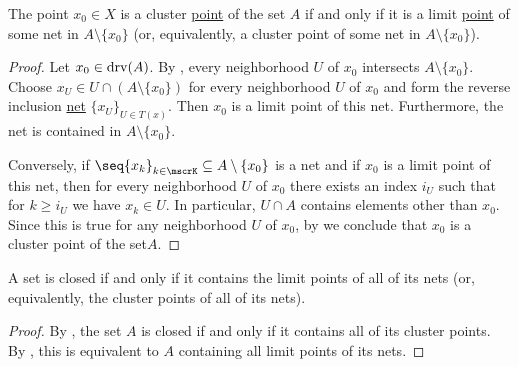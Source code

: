 \begin{proposition}\label{thm:cluster_point_of_set_iff_limit_point_of_net}
  The point \( x_0 \in X \) is a cluster \hyperref[def:cluster_point]{point} of the set \( A \) if and only if it is a limit \hyperref[def:net_convergence/cluster]{point} of some net in \( A \setminus \{ x_0 \} \) (or, equivalently, a cluster point of some net in \( A \setminus \{ x_0 \} \)).
\end{proposition}
\begin{proof}
  \SufficiencySubProof Let \( x_0 \in \operatorname{drv}(A) \). By , every neighborhood \( U \) of \( x_0 \) intersects \( A \setminus \{ x_0 \} \). Choose \( x_U \in U \cap (A \setminus \{ x_0 \}) \) for every neighborhood \( U \) of \( x_0 \) and form the reverse inclusion \hyperref[ex:reverse_inclusion_net]{net} \( \{ x_U \}_{U \in T(x)} \). Then \( x_0 \) is a limit point of this net. Furthermore, the net is contained in \( A \setminus \{ x_0 \} \).

  \NecessitySubProof Conversely, if \( \seq{ x_k }_{k \in \mscrK} \subseteq A \setminus \{ x_0 \} \) is a net and if \( x_0 \) is a limit point of this net, then for every neighborhood \( U \) of \( x_0 \) there exists an index \( i_U \) such that for \( k \geq i_U \) we have \(  x_k \in U \). In particular, \( U \cap A \) contains elements other than \( x_0 \). Since this is true for any neighborhood \( U \) of \( x_0 \), by  we conclude that \( x_0 \) is a cluster point of the set\( A \).
\end{proof}

\begin{corollary}\label{thm:closed_iff_contains_all_net_cluster_points}
  A set is closed if and only if it contains the limit points of all of its nets (or, equivalently, the cluster points of all of its nets).
\end{corollary}
\begin{proof}
  By , the set \( A \) is closed if and only if it contains all of its cluster points. By , this is equivalent to \( A \) containing all limit points of its nets.
\end{proof}

